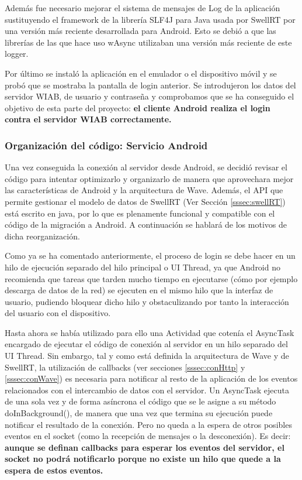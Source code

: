     Además fue necesario mejorar el sistema de mensajes de Log de la aplicación sustituyendo el framework de la librería SLF4J para Java usada por SwellRT por una versión más reciente desarrollada para Android\cite{ref:slf4j_android}. Esto se debió a que las librerías de las que hace uso wAsync utilizaban una versión más reciente de este logger.
        
    Por último se instaló la aplicación en el emulador o el dispositivo móvil y se probó que se mostraba la pantalla de login anterior. Se introdujeron los datos del servidor WIAB, de usuario y contraseña y comprobamos que se ha conseguido el objetivo de esta parte del proyecto: \textbf{el cliente Android realiza el login contra el servidor WIAB correctamente.} 
     
    		\subsubsection{Organización del código: Servicio Android}\label{sssec:orgCodServAnd}
    
    Una vez conseguida la conexión al servidor desde Android, se decidió revisar el código para intentar optimizarlo y organizarlo de manera que aprovechara mejor las características de Android y la arquitectura de Wave. Además, el API que permite gestionar el modelo de datos de SwellRT (Ver Sección \ref{sssec:swellRT}) está escrito en java, por lo que es plenamente funcional y compatible con el código de la migración a Android. A continuación se hablará de los motivos de dicha reorganización.
  
    Como ya se ha comentado anteriormente, el proceso de login se debe hacer en un hilo de ejecución separado del hilo principal o UI Thread, ya que Android no recomienda\cite{ref:android_processes} que tareas que tarden mucho tiempo en ejecutarse (cómo por ejemplo descarga de datos de la red) se ejecuten en el mismo hilo que la interfaz de usuario, pudiendo bloquear dicho hilo y obstaculizando por tanto la interacción del usuario con el dispositivo.
      
    Hasta ahora se había utilizado para ello una Actividad que cotenía el AsyncTask \cite{ref:android_asynctask} encargado de ejecutar el código de conexión al servidor en un hilo separado del UI Thread. Sin embargo, tal y como está definida la arquitectura de Wave y de SwellRT, la utilización de callbacks (ver secciones \ref{sssec:conHttp} y \ref{sssec:conWave}) es necesaria para notificar al resto de la aplicación de los eventos relacionados con el intercambio de datos con el servidor. Un AsyncTask ejecuta de una sola vez y de forma asíncrona el código que se le asigne a su método doInBackground(), de manera que una vez que termina su ejecución puede notificar el resultado de la conexión. Pero no queda a la espera de otros posibles eventos en el socket (como la recepción de mensajes o la desconexión). Es decir: \textbf{aunque se definan callbacks para esperar los eventos del servidor, el socket no podrá notificarlo porque no existe un hilo que quede a la espera de estos eventos.}

